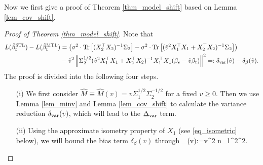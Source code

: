 Now we first give a proof of Theorem \ref{thm_model_shift} based on Lemma \ref{lem_cov_shift}. 

\begin{proof}[Proof of Theorem \ref{thm_model_shift}]
Note that 
\begin{align*}
L(\hat{\beta}_t^{\text{STL}}) - L(\hat{\beta}_t^{\text{MTL}}) &=\left( \sigma^2 \cdot \operatorname{Tr}\left[(X_2^{\top}X_2)^{-1}\Sigma_2\right] - \sigma^2 \cdot \operatorname{Tr}\left[( \hat{v}^2 X_1^{\top}X_1 + X_2^{\top}X_2)^{-1} \Sigma_2\right]\right) \\
&- \hat{v}^2 \left\| \Sigma_2^{1/2}(\hat{v}^2 X_1^{\top}X_1 + X_2^{\top}X_2)^{-1} X_1^{\top}X_1 (\beta_s - \hat{v} \beta_t) \right\|^2=:\delta_{\text{var}}(\hat v) - \delta_{\beta}(\hat v).
\end{align*}
The proof is divided into the following four steps. 
\begin{itemize}
\item[(i)] We first consider $\hat M \equiv \hat M(v)= v\Sigma_1^{1/2}\Sigma_2^{-1/2}$ for a fixed $v\ge 0$. Then we use Lemma \ref{lem_minv} and Lemma \ref{lem_cov_shift} to calculate the variance reduction $\delta_{\text{var}}(v)$, which will lead to the $\Delta_{\text{var}}$ term.

\item[(ii)] Using the approximate isometry property of $X_1$ (see \eqref{eq_isometric} below), we will bound the bias term $ \delta_{\beta}(v)$
through 
\be\label{deltabetapf}
\wt\delta_{\beta}(v):={v}^2 n_1^2^2.\ee


\end{itemize}
\end{proof}
